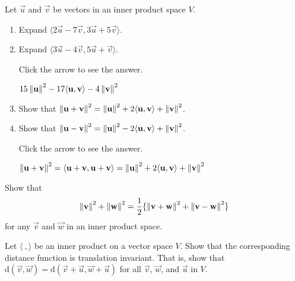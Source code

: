 \documentclass{ximera}
\begin{document}
\begin{problem}\label{prob:inner_prod_22}
Let $\vec{u}$ and $\vec{v}$ be vectors in an inner product space $V$.

\begin{enumerate} 
\item Expand $\langle2\vec{u} - 7\vec{v}, 3\vec{u} + 5\vec{v} \rangle$.

\item Expand $\langle3\vec{u} - 4\vec{v}, 5\vec{u} + \vec{v} \rangle$.

Click the arrow to see the answer.
\begin{expandable}
$15\left\lVert\mathbf{u}\right\rVert^{2} - 17 \langle \mathbf{u}, \mathbf{v} \rangle - 4\left\lVert\mathbf{v}\right\rVert^{2}$
\end{expandable}

\item Show that $\left\lVert \mathbf{u} + \mathbf{v} \right\rVert ^2 = \left\lVert \mathbf{u} \right\rVert ^2 + 2 \langle \mathbf{u}, \mathbf{v} \rangle + \left\lVert \mathbf{v} \right\rVert ^2 $.

\item Show that $\left\lVert \mathbf{u} - \mathbf{v} \right\rVert ^2 = \left\lVert \mathbf{u} \right\rVert ^2 - 2 \langle \mathbf{u}, \mathbf{v} \rangle +
\left\lVert \mathbf{v} \right\rVert ^2$.

Click the arrow to see the answer.
\begin{expandable}
$\left\lVert\mathbf{u} + \mathbf{v}\right\rVert^{2} = \langle \mathbf{u} + \mathbf{v}, \mathbf{u} + \mathbf{v} \rangle = \left\lVert\mathbf{u}\right\rVert^{2} + 2\langle \mathbf{u}, \mathbf{v}\rangle + \left\lVert\mathbf{v}\right\rVert^{2}$
\end{expandable}
\end{enumerate}

\end{problem}

\begin{problem}\label{prob:inner_prod_23}
Show that
\begin{equation*}
\left\lVert \mathbf{v} \right\rVert ^2 +
\left\lVert \mathbf{w} \right\rVert ^2 = \frac{1}{2} \{
\left\lVert \mathbf{v} + \mathbf{w} \right\rVert ^2 +
\left\lVert \mathbf{v} - \mathbf{w} \right\rVert ^2\}
\end{equation*}
for any $\vec{v}$ and $\vec{w}$ in an inner product space.
\end{problem}

\begin{problem}\label{prob:inner_prod_24}
Let $\langle\ , \rangle$ be an inner product on a vector space $V$. Show that the corresponding distance function is translation invariant. That is, show that \newline $\mbox{d}(\vec{v}, \vec{w}) = \mbox{d}(\vec{v} + \vec{u}, \vec{w} + \vec{u})$ for all $\vec{v}$, $\vec{w}$, and $\vec{u}$ in $V$.
\end{problem}
\end{document}
